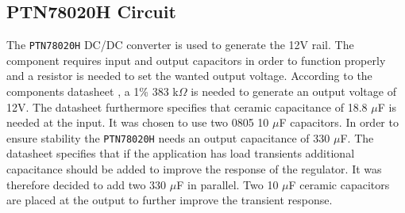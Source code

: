 


\subsection{PTN78020H Circuit}
The \texttt{PTN78020H} DC/DC converter is used to generate the 12V rail. 
The component requires input and output capacitors in order to function properly and a resistor is needed to set the wanted output voltage. 
According to the components datasheet \cite{PTN78020H}, a 1\% 383 k$\Omega$ is needed to generate an output voltage of 12V.
The datasheet furthermore specifies that ceramic capacitance of 18.8 $\mu$F is needed at the input. 
It was chosen to use two 0805 10 $\mu$F capacitors.
In order to ensure stability the \texttt{PTN78020H} needs an output capacitance of 330 $\mu$F.
The datasheet specifies that if the application has load transients additional capacitance should be added to improve the response of the regulator. 
It was therefore decided to add two 330 $\mu$F in parallel. 
Two 10 $\mu$F ceramic capacitors are placed at the output to further improve the transient response. 
